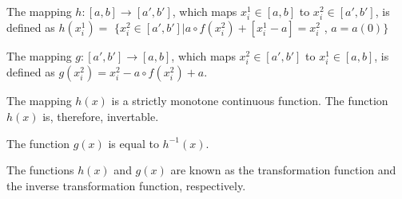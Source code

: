 \documentclass[twoside,reqno,11pt]{fcaa-var} %
\begin{document}
\begin{definition}\label{def:h}
The mapping $h : [a, b] \rightarrow [a',b']$, which maps $x_i^1 \in [a, b]$ to $x_i^2 \in [a',b']$, is defined as
$h(x_i^1) =$ $\{x_i^2 \in [a' ,b'] | a\circ f(x_i^2) + [x_i^1 - a] = x_i^2$ , $a = a(0)\}$
\end{definition}

\begin{definition}\label{def:g}
The mapping $g:[a', b'] \rightarrow [a, b]$, which maps $x_i^2 \in [a' , b']$ to $x_i^1\in [a, b]$,
is defined as $g(x_i^2) = x_i^2 - a \circ f (x_i^2) + a$.
\end{definition}

\begin{theorem}
The mapping $h(x)$ is a strictly monotone continuous function. The function $h(x)$ is, therefore, invertable.
\end{theorem}

\begin{theorem}
\label{t:inv}
The function $g(x)$ is equal to $h^{-1}(x)$.
\end{theorem}

\noindent
The functions $h(x)$ and $g(x)$ are known as the transformation function and the inverse transformation function, respectively. 
\end{document}
